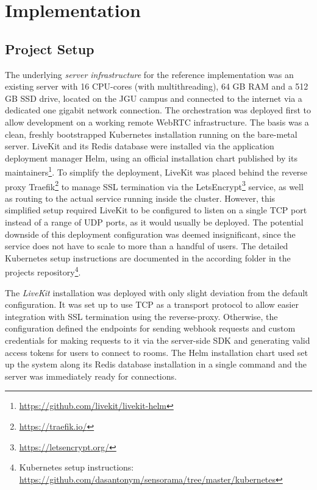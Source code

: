 \chapter{Implementation}

\section{Project Setup}

The underlying \emph{server infrastructure} for the reference implementation was an existing server with 16 \ac{CPU}-cores (with multithreading), 64 \ac{GB} \ac{RAM} and a 512 \ac{GB} \ac{SSD} drive, located on the \ac{JGU} campus and connected to the internet via a dedicated one gigabit network connection.
The orchestration was deployed first to allow development on a working remote WebRTC infrastructure.
The basis was a clean, freshly bootstrapped Kubernetes installation running on the bare-metal server.
LiveKit and its Redis database were installed via the application deployment manager Helm, using an official installation chart published by its maintainers\footnote{\url{https://github.com/livekit/livekit-helm}}.
To simplify the deployment, LiveKit was placed behind the reverse proxy Traefik\footnote{\url{https://traefik.io/}} to manage \ac{SSL} termination via the LetsEncrypt\footnote{\url{https://letsencrypt.org/}} service, as well as routing to the actual service running inside the cluster.
However, this simplified setup required LiveKit to be configured to listen on a single \ac{TCP} port instead of a range of UDP ports, as it would usually be deployed.
The potential downside of this deployment configuration was deemed insignificant, since the service does not have to scale to more than a handful of users.
The detailed Kubernetes setup instructions are documented in the according folder in the project\textquotesingle s repository\footnote{Kubernetes setup instructions: \href{https://github.com/dasantonym/sensorama/tree/master/kubernetes}{https://github.com/dasantonym/sensorama/tree/master/kubernetes}}.

The \emph{LiveKit} installation was deployed with only slight deviation from the default configuration.
It was set up to use \ac{TCP} as a transport protocol to allow easier integration with \ac{SSL} termination using the reverse-proxy.
Otherwise, the configuration defined the endpoints for sending webhook requests and custom credentials for making requests to it via the server-side \ac{SDK} and generating valid access tokens for users to connect to rooms.
The Helm installation chart used set up the system along its Redis database installation in a single command and the server was immediately ready for connections.

